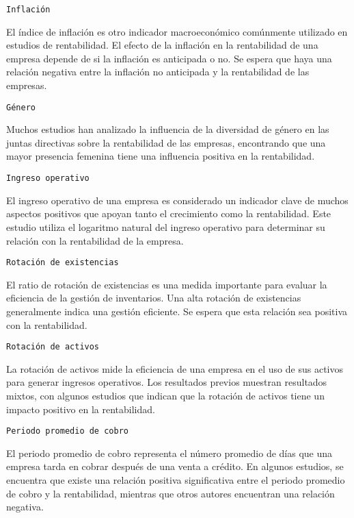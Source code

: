 \documentclass[
]{article}
\begin{document}
\begin{verbatim}
Inflación
\end{verbatim}

El índice de inflación es otro indicador macroeconómico comúnmente
utilizado en estudios de rentabilidad. El efecto de la inflación en la
rentabilidad de una empresa depende de si la inflación es anticipada o
no. Se espera que haya una relación negativa entre la inflación no
anticipada y la rentabilidad de las empresas.

\begin{verbatim}
Género
\end{verbatim}

Muchos estudios han analizado la influencia de la diversidad de género
en las juntas directivas sobre la rentabilidad de las empresas,
encontrando que una mayor presencia femenina tiene una influencia
positiva en la rentabilidad.

\begin{verbatim}
Ingreso operativo
\end{verbatim}

El ingreso operativo de una empresa es considerado un indicador clave de
muchos aspectos positivos que apoyan tanto el crecimiento como la
rentabilidad. Este estudio utiliza el logaritmo natural del ingreso
operativo para determinar su relación con la rentabilidad de la empresa.

\begin{verbatim}
Rotación de existencias
\end{verbatim}

El ratio de rotación de existencias es una medida importante para
evaluar la eficiencia de la gestión de inventarios. Una alta rotación de
existencias generalmente indica una gestión eficiente. Se espera que
esta relación sea positiva con la rentabilidad.

\begin{verbatim}
Rotación de activos
\end{verbatim}

La rotación de activos mide la eficiencia de una empresa en el uso de
sus activos para generar ingresos operativos. Los resultados previos
muestran resultados mixtos, con algunos estudios que indican que la
rotación de activos tiene un impacto positivo en la rentabilidad.

\begin{verbatim}
Periodo promedio de cobro
\end{verbatim}

El periodo promedio de cobro representa el número promedio de días que
una empresa tarda en cobrar después de una venta a crédito. En algunos
estudios, se encuentra que existe una relación positiva significativa
entre el periodo promedio de cobro y la rentabilidad, mientras que otros
autores encuentran una relación negativa.
\end{document}
